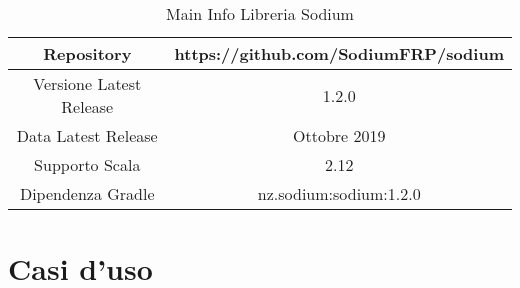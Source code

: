 \documentclass[../main.tex]{subfiles}
\begin{document}
\begin{table}[H]
\centering
\begin{tabular}{|c|c|}
     \hline
     Repository & https://github.com/SodiumFRP/sodium \\
     \hline
     Versione Latest Release & 1.2.0 \\
     \hline
     Data Latest Release & Ottobre 2019 \\
     \hline
     Supporto Scala & 2.12 \\
     \hline
     Dipendenza Gradle & nz.sodium:sodium:1.2.0 \\
     \hline
\end{tabular}
\caption{Main Info Libreria Sodium}
\end{table}
\section{Casi d'uso}
\end{document}
